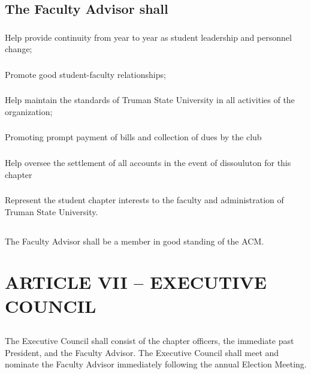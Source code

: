 \documentclass[12pt]{article}
\begin{document}
\subsection{The Faculty Advisor shall}
\subsubsection{}	Help provide continuity from year to year as student leadership and personnel change;
\subsubsection{}	Promote good student-faculty relationships;
\subsubsection{}	Help maintain the standards of Truman State University in all activities of the organization;
\subsubsection{}	Promoting prompt payment of bills and collection of dues by the club
\subsubsection{}	Help oversee the settlement of all accounts in the event of dissouluton for this chapter
\subsubsection{}	Represent the student chapter interests to the faculty and administration of Truman State University.
\subsection{}	The Faculty Advisor shall be a member in good standing of the ACM.

\section{ARTICLE VII – EXECUTIVE COUNCIL}
\subsection{}	The Executive Council shall consist of the chapter officers, the immediate past President, and the Faculty Advisor. The Executive Council shall meet and nominate the Faculty Advisor immediately following the annual Election Meeting.
\end{document}
